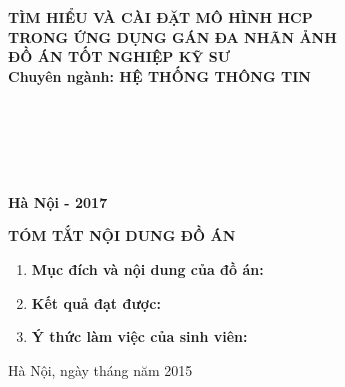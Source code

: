 \documentclass[13pt]{extreport}
\begin{document}
\begin{center}
\begin{center}
{\fontsize{18pt}{1}\selectfont \textbf{TÌM HIỂU VÀ CÀI ĐẶT MÔ HÌNH HCP\\
TRONG ỨNG DỤNG GÁN ĐA NHÃN ẢNH}}\\
\vspace{0.3in}
{\fontsize{17pt}{1}\selectfont \textbf{ĐỒ ÁN TỐT NGHIỆP KỸ SƯ}}\\
{\fontsize{17pt}{1}\selectfont \textbf{Chuyên ngành: HỆ THỐNG THÔNG TIN}}
\end{center}
\vspace{0.1in}
\begin{flushleft}
{}\\
{}\\
{}\\
{}\\
\end{flushleft}
\end{center}
\vspace{0.1in}
\begin{center}
{\fontsize{16pt}{1}\selectfont \textbf{Hà Nội - 2017} }\\
\end{center}
\newpage
\begin{center}
{\textbf{\fontsize{16pt}{1}\selectfont TÓM TẮT NỘI DUNG ĐỒ ÁN}}
\end{center}	
\begin{enumerate}
\fontsize{13pt}{15pt}\selectfont
\item \textbf{Mục đích và nội dung của đồ án:}
\vspace{1.5in}
\item \textbf{Kết quả đạt được:}
\vspace{1.5in}
\item \textbf{Ý thức làm việc của sinh viên:}
\vspace{1.5in}
\end{enumerate}
\fontsize{13pt}{15pt}\selectfont
\hspace{3in}Hà Nội, ngày \hspace{0.5cm} tháng \hspace{0.5cm} năm 2015\
\end{document}
